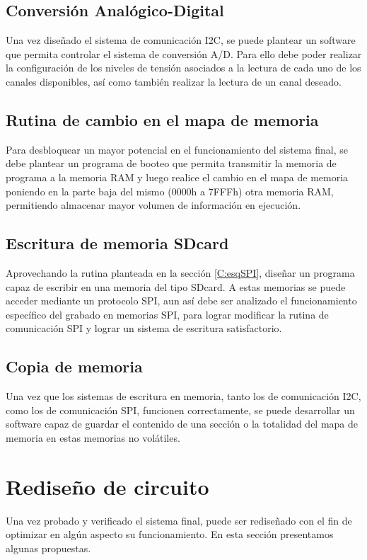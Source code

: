 \subsection{Conversión Analógico-Digital}
Una vez diseñado el sistema de comunicación I2C, se puede plantear un software que permita controlar el sistema de conversión A/D. Para ello debe poder realizar la configuración de los niveles de tensión asociados a la lectura de cada uno de los canales disponibles, así como también realizar la lectura de un canal deseado. 

\subsection{Rutina de cambio en el mapa de memoria}
Para desbloquear un mayor potencial en el funcionamiento del sistema final, se debe plantear un programa de booteo que permita transmitir la memoria de programa a la memoria RAM y luego realice el cambio en el mapa de memoria poniendo en la parte baja del mismo (0000h a 7FFFh) otra memoria RAM, permitiendo almacenar mayor volumen de información en ejecución. 

\subsection{Escritura de memoria SDcard}
Aprovechando la rutina planteada en la sección \ref{C:esqSPI}, diseñar un programa capaz de escribir en una memoria del tipo SDcard. A estas memorias se puede acceder mediante un protocolo SPI, aun así debe ser analizado el funcionamiento específico del grabado en memorias SPI, para lograr modificar la rutina de comunicación SPI y lograr un sistema de escritura satisfactorio. 



\subsection{Copia de memoria}
Una vez que los sistemas de escritura en memoria, tanto los de comunicación I2C, como los de comunicación SPI, funcionen correctamente, se puede desarrollar un software capaz de guardar el contenido de una sección o la totalidad del mapa de memoria en estas memorias no volátiles. 

\section{Rediseño de circuito}
Una vez probado y verificado el sistema final, puede ser rediseñado con el fin de optimizar en algún aspecto su funcionamiento. En esta sección presentamos algunas propuestas.

